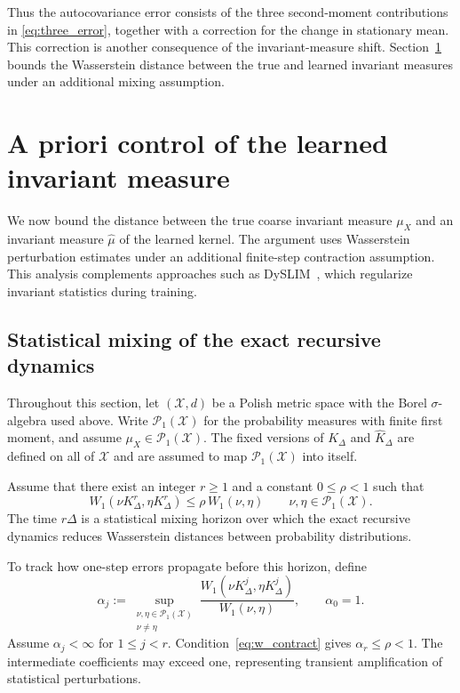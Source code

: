 \documentclass[final,hidelinks]{siamart251216}
\newcommand{\cX}{\mathcal{X}}
\newcommand{\Wone}{W_1}
\begin{document}
Thus the autocovariance error consists of the three second-moment
contributions in \eqref{eq:three_error}, together with a correction for
the change in stationary mean. This correction is another consequence of
the invariant-measure shift. Section~\ref{sec:stability} bounds the
Wasserstein distance between the true and learned invariant measures under
an additional mixing assumption.

\section{A priori control of the learned invariant measure}
\label{sec:stability}

We now bound the distance between the true coarse invariant measure $\mu_X$ and an invariant measure $\widehat\mu$ of the learned kernel. The argument uses Wasserstein perturbation estimates \cite{rudolfschweizer2018,armegioiu2026memory} under an additional finite-step contraction assumption. This analysis complements approaches
such as DySLIM~\cite{schiff2024dyslim}, which regularize invariant statistics during training.

\subsection{Statistical mixing of the exact recursive dynamics}

Throughout this section, let $(\cX,d)$ be a Polish metric space with the
Borel $\sigma$-algebra used above. Write $\mathcal P_1(\cX)$ for the
probability measures with finite first moment, and assume
$\mu_X\in\mathcal P_1(\cX)$. The fixed versions of $K_\Delta$ and
$\widehat K_\Delta$ are defined on all of $\cX$ and are assumed to map
$\mathcal P_1(\cX)$ into itself.

Assume that there exist an integer $r\ge1$ and a constant $0\le\rho<1$
such that
\begin{equation}
    \Wone(\nu K_\Delta^r,\eta K_\Delta^r)
    \le
    \rho\,\Wone(\nu,\eta)
    \qquad
    \nu,\eta\in\mathcal P_1(\cX).
    \label{eq:w_contract}
\end{equation}
The time $r\Delta$ is a statistical mixing horizon over which the exact
recursive dynamics reduces Wasserstein distances between probability
distributions.

To track how one-step errors propagate before this horizon, define
\begin{equation}
    \alpha_j
    :=
    \sup_{\substack{\nu,\eta\in\mathcal P_1(\cX)\\\nu\ne\eta}}
    \frac{
        \Wone(\nu K_\Delta^j,\eta K_\Delta^j)
    }{
        \Wone(\nu,\eta)
    },
    \qquad
    \alpha_0=1.
    \label{eq:w_amplification}
\end{equation}
Assume $\alpha_j<\infty$ for $1\le j<r$.
Condition~\eqref{eq:w_contract} gives $\alpha_r\le\rho<1$.
The intermediate coefficients may exceed one, representing transient
amplification of statistical perturbations.
\end{document}
